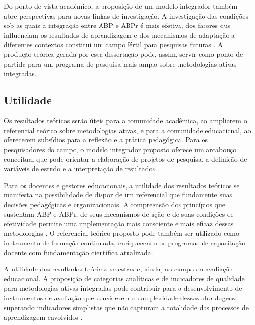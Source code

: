Do ponto de vista acadêmico, a proposição de um modelo integrador também abre perspectivas para novas linhas de investigação. A investigação das condições sob as quais a integração entre ABP e ABPr é mais efetiva, dos fatores que influenciam os resultados de aprendizagem e dos mecanismos de adaptação a diferentes contextos constitui um campo fértil para pesquisas futuras \cite{SANTOS2024}. A produção teórica gerada por esta dissertação pode, assim, servir como ponto de partida para um programa de pesquisa mais amplo sobre metodologias ativas integradas.

\subsection{Utilidade}
\label{subsec:jt_utilidade}

Os resultados teóricos serão úteis para a comunidade acadêmica, ao ampliarem o referencial teórico sobre metodologias ativas, e para a comunidade educacional, ao oferecerem subsídios para a reflexão e a prática pedagógica. Para os pesquisadores do campo, o modelo integrador proposto oferece um arcabouço conceitual que pode orientar a elaboração de projetos de pesquisa, a definição de variáveis de estudo e a interpretação de resultados \cite{CRESWELL2018}.

Para os docentes e gestores educacionais, a utilidade dos resultados teóricos se manifesta na possibilidade de dispor de um referencial que fundamente suas decisões pedagógicas e organizacionais. A compreensão dos princípios que sustentam ABP e ABPr, de seus mecanismos de ação e de suas condições de efetividade permite uma implementação mais consciente e mais eficaz dessas metodologias \cite{MIRANDA2022}. O referencial teórico proposto pode também ser utilizado como instrumento de formação continuada, enriquecendo os programas de capacitação docente com fundamentação científica atualizada.

A utilidade dos resultados teóricos se estende, ainda, ao campo da avaliação educacional. A proposição de categorias analíticas e de indicadores de qualidade para metodologias ativas integradas pode contribuir para o desenvolvimento de instrumentos de avaliação que considerem a complexidade dessas abordagens, superando indicadores simplistas que não capturam a totalidade dos processos de aprendizagem envolvidos \cite{BLACK1998}.

